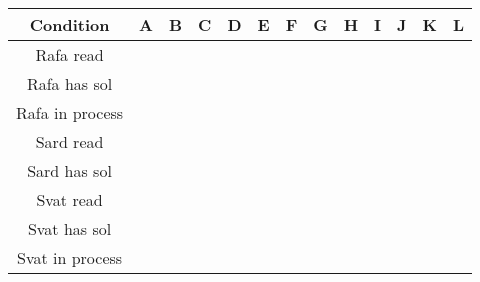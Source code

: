 \documentclass{article}
\begin{document}
    \begin{table}[h!]
        \centering
        \begin{tabular}{|c|c|c|c|c|c|c|c|c|c|c|c|c|}
            \hline
            \textbf{Condition} & A & B & C & D & E & F & G & H & I & J & K & L \\
            \hline
            Rafa read &   &   &   &   &   &   &   &   &   &   &   &   \\
            \hline
            Rafa has sol &   &   &   &   &   &   &   &   &   &   &   &   \\
            \hline
            Rafa in process &   &   &   &   &   &   &   &   &   &   &   &   \\
            \hline
            Sard read &   &   &   &   &   &   &   &   &   &   &   &   \\
            \hline
            Sard has sol &   &   &   &   &   &   &   &   &   &   &   &   \\
            \hline
            Svat read &   &   &   &   &   &   &   &   &   &   &   &   \\
            \hline
            Svat has sol &   &   &   &   &   &   &   &   &   &   &   &   \\
            \hline
            Svat in process &   &   &   &   &   &   &   &   &   &   &   &   \\
            \hline
        \end{tabular}
    \end{table}
\end{document}
